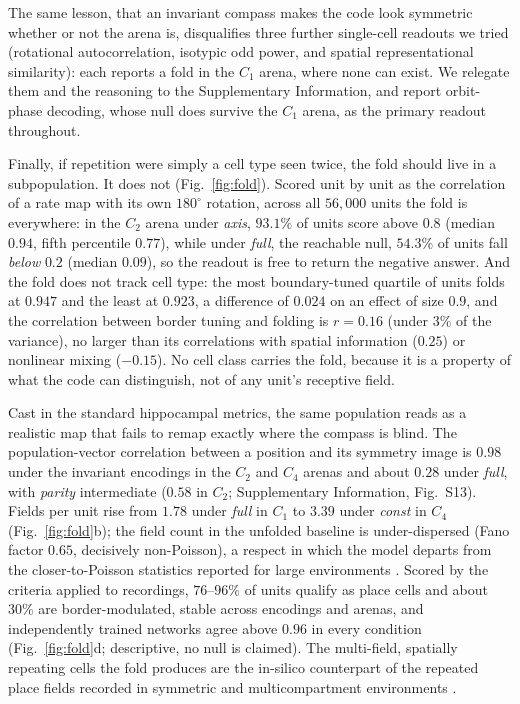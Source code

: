 \documentclass[9pt,lineno]{elife}
\begin{document}
The same lesson, that an invariant compass makes the code look symmetric whether or not the arena is,
disqualifies three further single-cell readouts we tried (rotational autocorrelation, isotypic odd
power, and spatial representational similarity): each reports a fold in the $C_1$ arena, where none can
exist. We relegate them and the reasoning to the Supplementary Information, and report orbit-phase
decoding, whose null does survive the $C_1$ arena, as the primary readout throughout.

Finally, if repetition were simply a cell type seen twice, the fold should live in a subpopulation. It
does not (Fig.~\ref{fig:fold}). Scored unit by unit as the correlation of a rate map with its own
$180^\circ$ rotation, across all $56{,}000$ units the fold is everywhere: in the $C_2$ arena under
\textit{axis}, $93.1\%$ of units score above $0.8$ (median $0.94$, fifth percentile $0.77$), while under
\textit{full}, the reachable null, $54.3\%$ of units fall \emph{below} $0.2$ (median $0.09$), so the
readout is free to return the negative answer. And the fold does not track cell type: the most
boundary-tuned quartile of units folds at $0.947$ and the least at $0.923$, a difference of $0.024$ on an
effect of size $0.9$, and the correlation between border tuning and folding is $r = 0.16$ (under $3\%$ of
the variance), no larger than its correlations with spatial information ($0.25$) or nonlinear mixing
($-0.15$). No cell class carries the fold, because it is a property of what the code can distinguish, not
of any unit's receptive field.

Cast in the standard hippocampal metrics, the same population reads as a realistic map that fails to
remap exactly where the compass is blind. The population-vector correlation \citep{leutgeb2005} between a
position and its symmetry image is $0.98$ under the invariant encodings in the $C_2$ and $C_4$ arenas
and about $0.28$ under \textit{full}, with \textit{parity} intermediate ($0.58$ in $C_2$;
Supplementary Information, Fig.~S13). Fields per
unit rise from $1.78$ under \textit{full} in $C_1$ to $3.39$ under \textit{const} in $C_4$ (Fig.~\ref{fig:fold}b); the field
count in the unfolded baseline is under-dispersed (Fano factor $0.65$, decisively non-Poisson), a
respect in which the model departs from the closer-to-Poisson statistics reported for large environments
\citep{rich2014}. Scored by the criteria applied to recordings, $76$--$96\%$ of units qualify as place
cells and about $30\%$ are border-modulated, stable across encodings and arenas, and independently
trained networks agree above $0.96$ in every condition (Fig.~\ref{fig:fold}d; descriptive, no null is claimed). The
multi-field, spatially repeating cells the fold produces are the in-silico counterpart of the repeated
place fields recorded in symmetric and multicompartment environments \citep{grieves2016, derdikman2009}.
\end{document}
